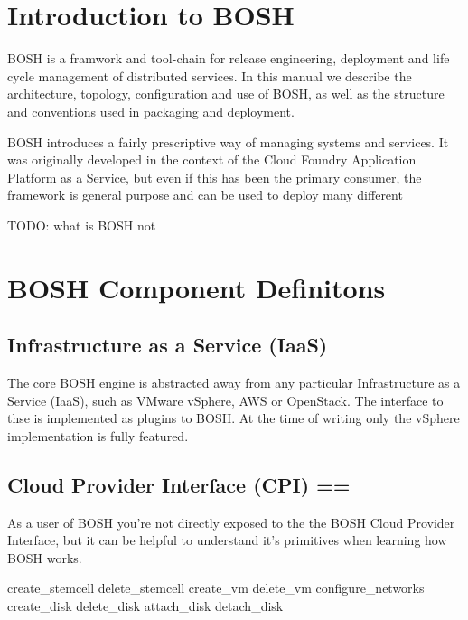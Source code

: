 
\def\mytitle{BOSH Documentation}
\def\myauthor{VMware 2012 - Cloud Foundry}
\def\latexmode{memoir}

\chapter{Introduction to BOSH}
\label{introductiontobosh}

BOSH is a framwork and tool-chain for release engineering, deployment
and life cycle management of distributed services. In this manual we
describe the architecture, topology, configuration and use of BOSH, as
well as the structure and conventions used in packaging and deployment.

BOSH introduces a fairly prescriptive way of managing systems and
services. It was originally developed in the context of the Cloud
Foundry Application Platform as a Service, but even if this has been the
primary consumer, the framework is general purpose and can be used to
deploy many different

TODO: what is BOSH not

\chapter{BOSH Component Definitons}
\label{boshcomponentdefinitons}

\section{Infrastructure as a Service (IaaS)}
\label{infrastructureasaserviceiaas}

The core BOSH engine is abstracted away from any particular
Infrastructure as a Service (IaaS), such as VMware vSphere, AWS or
OpenStack. The interface to thse is implemented as plugins to BOSH. At
the time of writing only the vSphere implementation is fully featured.

\section{Cloud Provider Interface (CPI) ==}
\label{cloudproviderinterfacecpi}

As a user of BOSH you're not directly exposed to the the BOSH Cloud
Provider Interface, but it can be helpful to understand it's primitives
when learning how BOSH works.

create\_stemcell
delete\_stemcell
create\_vm
delete\_vm
configure\_networks
create\_disk
delete\_disk
attach\_disk
detach\_disk

